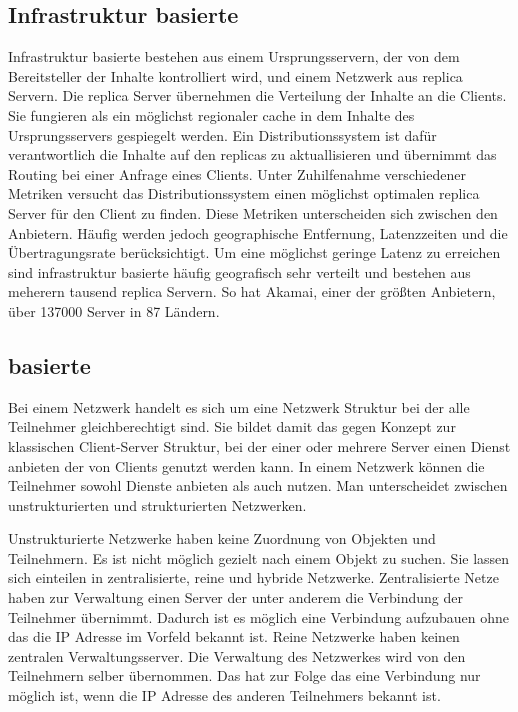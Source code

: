 \subsection{Infrastruktur basierte \cdns}
Infrastruktur basierte \cdns bestehen aus einem Ursprungsservern, der von dem Bereitsteller der Inhalte kontrolliert wird, und einem Netzwerk aus replica Servern. Die replica Server übernehmen die Verteilung der Inhalte an die Clients. Sie fungieren als ein möglichst regionaler cache in dem Inhalte des Ursprungsservers gespiegelt werden. Ein Distributionssystem ist dafür verantwortlich die Inhalte auf den replicas zu aktuallisieren und übernimmt das Routing bei einer Anfrage eines Clients. Unter Zuhilfenahme verschiedener Metriken versucht das Distributionssystem einen möglichst optimalen replica Server für den Client zu finden. Diese Metriken unterscheiden sich zwischen den Anbietern. Häufig werden jedoch geographische Entfernung, Latenzzeiten und die Übertragungsrate berücksichtigt. Um eine möglichst geringe Latenz zu erreichen sind infrastruktur basierte \cdns häufig geografisch sehr verteilt und bestehen aus meherern tausend replica Servern. So hat Akamai, einer der größten \cdn Anbietern, über 137000 Server in 87 Ländern. \cite{akamaiPeer} 


\subsection{\pTp basierte \cdns }

Bei einem \pTp Netzwerk handelt es sich um eine Netzwerk Struktur bei der alle Teilnehmer gleichberechtigt sind. Sie bildet damit das gegen Konzept zur klassischen Client-Server Struktur, bei der einer oder mehrere Server einen Dienst anbieten der von Clients genutzt werden kann. In einem \pTp Netzwerk können die Teilnehmer sowohl Dienste anbieten als auch nutzen. Man unterscheidet zwischen unstrukturierten und strukturierten \pTp Netzwerken. 

Unstrukturierte Netzwerke haben keine Zuordnung von Objekten und Teilnehmern. Es ist nicht möglich gezielt nach einem Objekt zu suchen. Sie lassen sich einteilen in zentralisierte, reine und hybride \pTp Netzwerke. Zentralisierte Netze haben zur Verwaltung einen Server der unter anderem die Verbindung der Teilnehmer übernimmt. Dadurch ist es möglich eine Verbindung aufzubauen ohne das die IP Adresse im Vorfeld bekannt ist. Reine \pTp Netzwerke haben keinen zentralen Verwaltungsserver. Die Verwaltung des Netzwerkes wird von den Teilnehmern selber übernommen. Das hat zur Folge das eine Verbindung nur möglich ist, wenn die IP Adresse des anderen Teilnehmers bekannt ist. 

